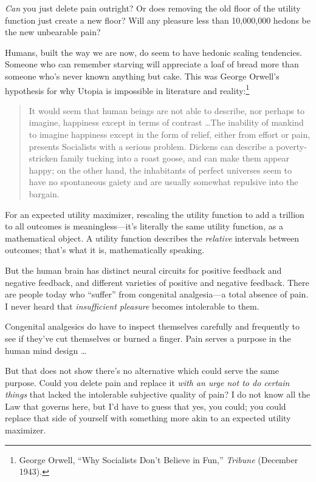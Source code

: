 {
 \textit{Can} you just delete pain outright? Or does removing the
old floor of the utility function just create a new floor? Will any
pleasure less than 10,000,000 hedons be the new unbearable pain?}

{
 Humans, built the way we are now, do seem to have hedonic scaling
tendencies. Someone who can remember starving will appreciate a loaf of
bread more than someone who's never known anything but
cake. This was George Orwell's hypothesis for why
Utopia is impossible in literature and reality:\footnote{George Orwell, ``Why Socialists
Don't Believe in Fun,''
\textit{Tribune} (December 1943).}}

\begin{quote}
{
 It would seem that human beings are not able to describe, nor
perhaps to imagine, happiness except in terms of contrast \ldots The
inability of mankind to imagine happiness except in the form of relief,
either from effort or pain, presents Socialists with a serious problem.
Dickens can describe a poverty-stricken family tucking into a roast
goose, and can make them appear happy; on the other hand, the
inhabitants of perfect universes seem to have no spontaneous gaiety and
are usually somewhat repulsive into the bargain.}
\end{quote}

{
 For an expected utility maximizer, rescaling the utility function
to add a trillion to all outcomes is meaningless---it's
literally the same utility function, as a mathematical object. A
utility function describes the \textit{relative} intervals between
outcomes; that's what it is, mathematically speaking.}

{
 But the human brain has distinct neural circuits for positive
feedback and negative feedback, and different varieties of positive and
negative feedback. There are people today who
``suffer'' from congenital
analgesia---a total absence of pain. I never heard that
\textit{insufficient pleasure} becomes intolerable to them.}

{
 Congenital analgesics do have to inspect themselves carefully and
frequently to see if they've cut themselves or burned a
finger. Pain serves a purpose in the human mind design \ldots}

{
 But that does not show there's no alternative
which could serve the same purpose. Could you delete pain and replace
it \textit{with an urge not to do certain things} that lacked the
intolerable subjective quality of pain? I do not know all the Law that
governs here, but I'd have to guess that yes, you
could; you could replace that side of yourself with something more akin
to an expected utility maximizer.}

